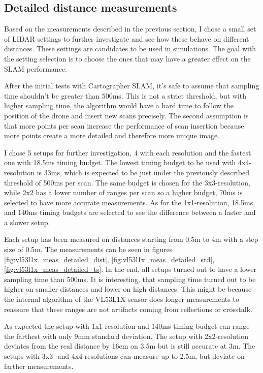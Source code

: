 \subsection{Detailed distance measurements} \label{sect:vl53l1x_detailed_measurements}
Based on the measurements described in the previous section, I chose a small set of LIDAR settings
to further investigate and see how these behave on different distances. These settings are
candidates to be used in simulations. The goal with the setting selection is to choose the ones
that may have a greater effect on the SLAM performance.

After the initial tests with Cartographer SLAM, it's safe to assume that sampling time shouldn't be
greater than 500ms. This is not a strict threshold, but with higher sampling time, the algorithm
would have a hard time to follow the position of the drone and insert new scans precisely. The second
assumption is that more points per scan increase the performance of scan insertion because more points
create a more detailed and therefore more unique image.

I chose 5 setups for further investigation, 4 with each resolution and the fastest one with 18.5ms
timing budget. The lowest timing budget to be used with 4x4-resolution is 33ms, which is expected to be
just under the previously described threshold of 500ms per scan. The same budget is chosen for the 3x3-resolution,
while 2x2 has a lower number of ranges per scan so a higher budget, 70ms is selected to
have more accurate measurements. As for the 1x1-resolution, 18.5ms, and 140ms timing budgets are selected to see
the difference between a faster and a slower setup.

Each setup has been measured on distances starting from 0.5m to 4m with a step size
of 0.5m. The measurements can be seen in figures \ref{fig:vl53l1x_meas_detailed_dist},
\ref{fig:vl53l1x_meas_detailed_std}, \ref{fig:vl53l1x_meas_detailed_ts}. In the end,
all setups turned out to have a lower sampling time than 500ms. It is interesting, that
sampling time turned out to be higher on smaller distances and lower on high distances.
This might be because the internal algorithm of the VL53L1X sensor does longer measurements
to reassure that these ranges are not artifacts coming from reflections or crosstalk.

As expected the setup with 1x1-resolution and 140ms timing budget can range the farthest
with only 9mm standard deviation. The setup with 2x2-resolution deviates from the real
distance by 16cm on 3.5m but is still accurate at 3m.
The setups with 3x3- and 4x4-resolutions can measure up to 2.5m, but deviate on farther
measurements.

